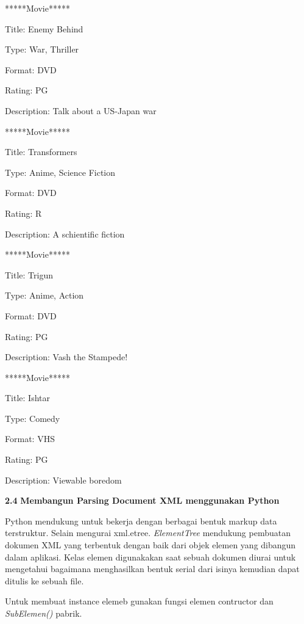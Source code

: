 *****Movie***** \par
\noindent 
Title: Enemy Behind \par
\noindent 
Type: War, Thriller \par
\noindent 
Format: DVD \par
\noindent 
Rating: PG \par
\noindent 
Description: Talk about a US-Japan war \par
\noindent 
*****Movie***** \par
\noindent 
Title: Transformers \par
\noindent 
Type: Anime, Science Fiction \par
\noindent 
Format: DVD \par
\noindent 
Rating: R \par
\noindent 
Description: A schientific fiction \par
\noindent 
*****Movie***** \par
\noindent 
Title: Trigun \par
\noindent 
Type: Anime, Action \par
\noindent 
Format: DVD \par
\noindent 
Rating: PG \par
\noindent 
Description: Vash the Stampede! \par
\noindent 
*****Movie***** \par
\noindent 
Title: Ishtar \par
\noindent 
Type: Comedy \par
\noindent 
Format: VHS \par
\noindent 
Rating: PG \par
\noindent 
Description: Viewable boredom \par
\vspace{12pt}
\noindent 
\textbf{2.4}\textbf{ Membangun Parsing Document XML menggunakan Python} \par
\noindent 
 \hspace*{0.5in} Python mendukung untuk bekerja dengan berbagai bentuk markup data terstruktur. Selain mengurai xml.etree. \textit{ElementTree} mendukung pembuatan dokumen XML yang terbentuk dengan baik dari objek elemen yang dibangun dalam aplikasi. Kelas elemen digunakakan saat sebuah dokumen diurai untuk mengetahui bagaimana menghasilkan bentuk serial dari isinya kemudian dapat ditulis ke sebuah file.  \par
\vspace{12pt}
\noindent 
 \hspace*{0.5in} Untuk membuat instance elemeb gunakan fungsi elemen contructor dan \textit{SubElemen()} pabrik. \par
